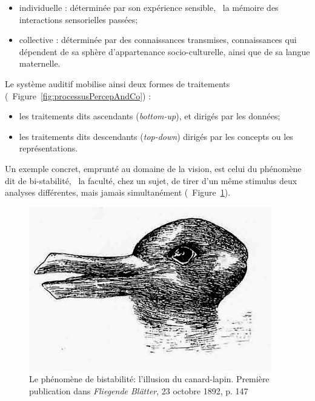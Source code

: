 \begin{itemize}
\item individuelle : déterminée par son expérience sensible, \ie~la mémoire des interactions sensorielles passées;
\item collective : déterminée par des connaissances transmises, connaissances qui dépendent de sa sphère d'appartenance socio-culturelle, ainsi que de sa langue maternelle.
\end{itemize}


Le système auditif mobilise ainsi deux formes de traitements (\cf~Figure~\ref{fig:processusPercepAndCo}) :

\begin{itemize}
\item les traitements dits ascendants (\emph{bottom-up}),  et dirigés par les données;
\item les traitements dits descendants (\emph{top-down}) dirigés par les concepts ou les représentations.
\end{itemize}

Un exemple concret, emprunté au domaine de la vision, est celui du phénomène dit de bi-stabilité, \ie~la faculté, chez un sujet, de tirer d'un même stimulus deux analyses différentes, mais jamais simultanément \citep{schwartz2012multistability} (\cf~Figure~\ref{fig:bistabilite}). \\

\begin{figure}[t]
        \myfloatalign
        \includegraphics[width=.6\linewidth]{gfx/canard_lapin}
        \caption[Le phénomène de bistabilité: l'illusion du canard-lapin]{Le phénomène de bistabilité: l'illusion du canard-lapin. Première publication dans \emph{Fliegende Blätter}, 23 octobre 1892, p. 147}\label{fig:bistabilite}
\end{figure}

